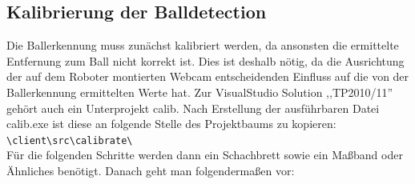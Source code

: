 
\subsection{Kalibrierung der Balldetection}
\label{sec:kalibr-der-balld}
Die Ballerkennung muss zunächst kalibriert werden, da ansonsten
die ermittelte Entfernung zum Ball nicht korrekt ist. Dies ist deshalb nötig,
da die Ausrichtung der auf dem Roboter montierten Webcam
entscheidenden Einfluss auf die von der Ballerkennung ermittelten
Werte hat. Zur VisualStudio Solution ,,TP2010/11'' gehört auch ein
Unterprojekt calib. Nach Erstellung der ausführbaren Datei calib.exe
ist diese an folgende Stelle des Projektbaums zu kopieren:
\verb|\client\src\calibrate\| \\ 
Für die folgenden Schritte werden dann ein Schachbrett sowie ein
Maßband oder Ähnliches benötigt. 
Danach geht man folgendermaßen vor:
